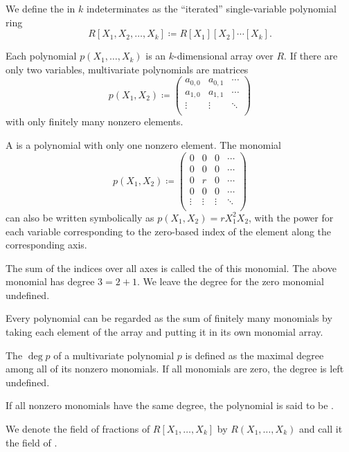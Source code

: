 \begin{definition}\label{def:multivariate_polynomial}
  We define the  in \( k \) indeterminates as the \enquote{iterated} single-variable polynomial ring
  \begin{equation*}
    R[X_1, X_2, \ldots, X_k] \coloneqq R[X_1][X_2] \cdots [X_k].
  \end{equation*}

  Each polynomial \( p(X_1, \ldots, X_k) \) is an \( k \)-dimensional array over \( R \). If there are only two variables, multivariate polynomials are matrices
  \begin{equation*}
    p(X_1, X_2) \coloneqq \begin{pmatrix}
      a_{0,0} & a_{0,1} & \cdots \\
      a_{1,0} & a_{1,1} & \cdots \\
      \vdots  & \vdots  & \ddots \\
    \end{pmatrix}
  \end{equation*}
  with only finitely many nonzero elements.

  A  is a polynomial with only one nonzero element. The monomial
  \begin{equation*}
    p(X_1, X_2) \coloneqq \begin{pmatrix}
      0       & 0       & 0       & \cdots \\
      0       & 0       & 0       & \cdots \\
      0       & r       & 0       & \cdots \\
      0       & 0       & 0       & \cdots \\
      \vdots  & \vdots  & \vdots  & \ddots \\
    \end{pmatrix}
  \end{equation*}
  can also be written symbolically as \( p(X_1, X_2) = r X_1^2 X_2 \), with the power for each variable corresponding to the zero-based index of the element along the corresponding axis.

  The sum of the indices over all axes is called the  of this monomial. The above monomial has degree \( 3 = 2 + 1 \). We leave the degree for the zero monomial undefined.

  Every polynomial can be regarded as the sum of finitely many monomials by taking each element of the array and putting it in its own monomial array.

  The  \( \deg p \) of a multivariate polynomial \( p \) is defined as the maximal degree among all of its nonzero monomials. If all monomials are zero, the degree is left undefined.

  If all nonzero monomials have the same degree, the polynomial is said to be .
\end{definition}

\begin{definition}\label{def:rational_algebraic_function}
  We denote the field of fractions of \( R[X_1, \ldots, X_k] \) by \( R(X_1, \ldots, X_k) \) and call it the field of .
\end{definition}
